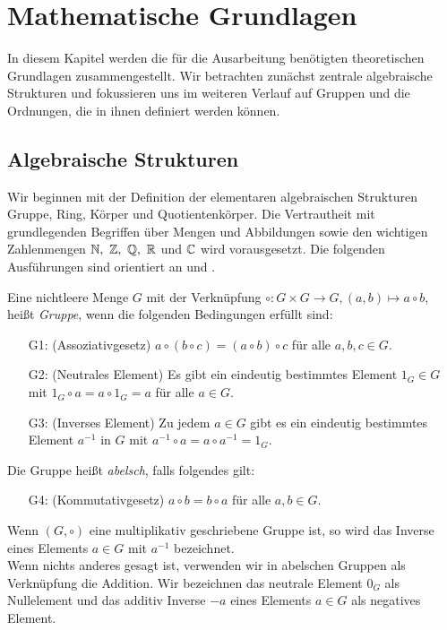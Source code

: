 \chapter{Mathematische Grundlagen}
In diesem Kapitel werden die für die Ausarbeitung benötigten theoretischen Grundlagen zusammengestellt. Wir betrachten zunächst zentrale algebraische Strukturen und fokussieren uns im weiteren Verlauf auf Gruppen und die Ordnungen, die in ihnen definiert werden können.
\section{Algebraische Strukturen}
Wir beginnen mit der Definition der elementaren algebraischen Strukturen Gruppe, Ring, Körper und Quotientenkörper. Die Vertrautheit mit grundlegenden Begriffen über Mengen und Abbildungen sowie den wichtigen Zahlenmengen $\mathbb{N}, ~\mathbb{Z},~ \mathbb{Q},~ \mathbb{R}$ und $\mathbb{C}$ wird vorausgesetzt. Die folgenden Ausführungen sind orientiert an \cite{rainer08} und \cite{fischer08}.
%
\begin{defn}\label{Gruppe}
Eine nichtleere Menge $G$ mit der Verknüpfung $\circ \colon G \times G \rightarrow G, \left( a, b\right) \mapsto a \circ b$, heißt \textit{Gruppe}, wenn die folgenden Bedingungen erfüllt sind:
\begin{enumerate}
\item[G1: ] (Assoziativgesetz) $a\circ \left(b\circ c\right) = \left(a\circ b\right) \circ c$ für alle $a, b, c \in G$.
\item[G2: ] (Neutrales Element) Es gibt ein eindeutig bestimmtes Element $1_G \in G$ mit $1_G \circ a  = a \circ 1_G = a$ für alle $a \in G$.
\item[G3: ] (Inverses Element) Zu jedem $a \in G$ gibt es ein eindeutig bestimmtes Element $a^{-1}$ in $G$ mit $a^{-1} \circ a = a \circ a^{-1} = 1_G$. 
\end{enumerate}
Die Gruppe heißt \textit{abelsch}, falls folgendes gilt:
\begin{enumerate} 
\item[G4: ] (Kommutativgesetz) $a \circ b = b \circ a$ für alle $a, b \in G$.  
\end{enumerate} 
\end{defn}
%
%
\begin{bem}
Wenn $\left(G, \circ\right)$ eine multiplikativ geschriebene Gruppe ist, so wird das Inverse eines Elements $a\in G$ mit $a^{-1}$ bezeichnet. \\
Wenn nichts anderes gesagt ist, verwenden wir in abelschen Gruppen als Verknüpfung die Addition. Wir bezeichnen das neutrale Element $0_G$ als Nullelement und das additiv Inverse $-a$ eines Elements $a\in G$ als negatives Element. 
\end{bem}
